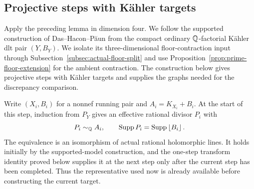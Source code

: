 \subsection{Projective steps with K\"ahler targets}

Apply the preceding lemma in dimension four.  We follow the supported
construction of Das--Hacon--P\u{a}un
\cite[Theorem~7.2]{DasHaconPaun2024} from the compact ordinary
\(\mathbb Q\)-factorial K\"ahler dlt pair \((Y,B_Y)\).  We isolate its
three-dimensional floor-contraction input through
Subsection~\ref{subsec:actual-floor-split} and use
Proposition~\ref{prop:prime-floor-extension} for the ambient contraction.
The construction below gives projective steps with K\"ahler targets and
supplies the graphs needed for the discrepancy comparison.

Write \((X_i,B_i)\) for a nonnef running pair and
\(A_i=K_{X_i}+B_i\).  At the start of this step, induction from
\(P_Y\) gives an effective rational divisor \(P_i\) with
\begin{equation}\label{eq:running-supported-representative}
 P_i\sim_\mathbb Q A_i,\qquad
 \operatorname{Supp} P_i=\operatorname{Supp}\left\lfloor B_i\right\rfloor.
\end{equation}
The equivalence is an isomorphism of actual rational holomorphic lines.
It holds initially by the supported-model construction, and the
one-step transform identity proved below supplies it at the next step
only after the current step has been completed.  Thus the representative
used now is already available before constructing the current target.

